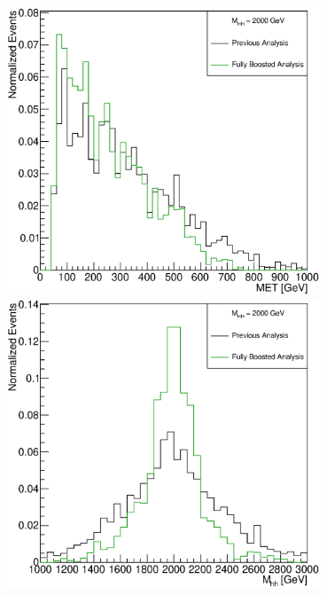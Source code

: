 \documentclass{beamer}
\begin{document}
\begin{frame}
\begin{columns}
\begin{column}{0.5\textwidth}
\begin{center}
\includegraphics[width=0.7\textwidth]{figures/WHad_plots_john_withcuts/electron/wlep_met_Xhh2000}\\
\includegraphics[width=0.7\textwidth]{figures/WHad_plots_john_withcuts/electron/hh_m_Xhh2000}
\end{center}
\end{column}
\end{columns}
\end{frame}
\end{document}
